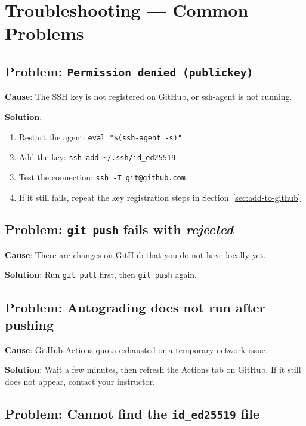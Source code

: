 \documentclass[
    a4paper,
    11pt,
    parskip=half
]{scrartcl}
\begin{document}
\section{Troubleshooting --- Common Problems}
\label{sec:troubleshoot}

\subsection*{Problem: \texttt{Permission denied (publickey)}}

\textbf{Cause}: The SSH key is not registered on GitHub, or ssh-agent is not running.

\textbf{Solution}:
\begin{enumerate}
    \item Restart the agent: \texttt{eval "\$(ssh-agent -s)"}
    \item Add the key: \texttt{ssh-add \textasciitilde/.ssh/id\_ed25519}
    \item Test the connection: \texttt{ssh -T git@github.com}
    \item If it still fails, repeat the key registration steps in Section~\ref{sec:add-to-github}
\end{enumerate}

\subsection*{Problem: \texttt{git push} fails with \textit{rejected}}

\textbf{Cause}: There are changes on GitHub that you do not have locally yet.

\textbf{Solution}: Run \texttt{git pull} first, then \texttt{git push} again.

\subsection*{Problem: Autograding does not run after pushing}

\textbf{Cause}: GitHub Actions quota exhausted or a temporary network issue.

\textbf{Solution}: Wait a few minutes, then refresh the Actions tab on GitHub. If it still does not appear, contact your instructor.

\subsection*{Problem: Cannot find the \texttt{id\_ed25519} file}
\end{document}
